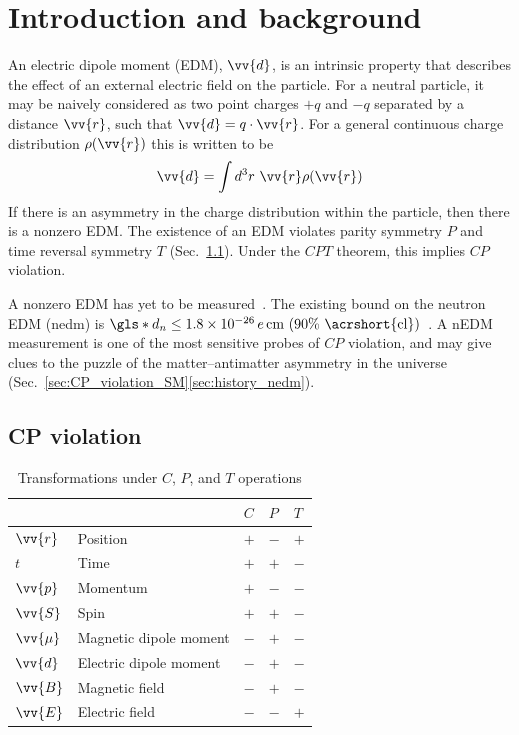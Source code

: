 
\chapter{Introduction and background}


An electric dipole moment (EDM), $\vv{d}$, is an intrinsic property that describes the effect of an external electric field on the particle. For a neutral particle, it may be naively considered as two point charges $+q$ and $-q$ separated by a distance $\vv{r}$, such that $\vv{d}=q\cdot \vv{r}$. For a general continuous charge distribution $\rho(\vv{r})$ this is written to be
%
\begin{gather}
    \vv{d}=\int d^3r\,\,\vv{r}\rho(\vv{r})
\end{gather}
%
If there is an asymmetry in the charge distribution within the particle, then there is a nonzero EDM. The existence of an EDM violates parity symmetry $P$ and time reversal symmetry $T$ (Sec.~\ref{sec:CP_violation}). Under the $CPT$ theorem, this implies $CP$ violation.

A nonzero EDM has yet to be measured~\cite{CHU19}. The existing bound on the neutron EDM (\acrshort*{nedm}) is $\gls*{d_n}\leq \num{1.8e-26}\,e\,\text{cm (90\% \acrshort{cl})}$~\cite{pdg2022}. A nEDM measurement is one of the most sensitive probes of $CP$ violation, and may give clues to the puzzle of the matter–antimatter asymmetry in the universe (Sec.~\ref{sec:CP_violation_SM}\textendash\ref{sec:history_nedm}).


\section{CP violation}\label{sec:CP_violation}


\begin{table}
\centering
\caption[Transformations of relevant physical observables under $C$, $P$, and $T$ operations]{\label{tb:cpt_transform}Transformations under $C$, $P$, and $T$ operations}
\begin{tabular}{lllll}
\toprule
& & $C$ & $P$ & $T$ \\ 
\midrule
$\vv{r}$ & Position & $+$ & $-$ & $+$ \\
$t$ & Time & $+$ & $+$ & $-$ \\
$\vv{p}$ & Momentum & $+$ & $-$ & $-$ \\
$\vv{S}$ & Spin & $+$ & $+$ & $-$ \\
$\vv{\mu}$ & Magnetic dipole moment  & $-$ & $+$ & $-$ \\
$\vv{d}$ & Electric dipole moment  & $-$ & $+$ & $-$ \\
$\vv{B}$ & Magnetic field  & $-$ & $+$ & $-$ \\
$\vv{E}$ & Electric field & $-$ & $-$ & $+$ \\
\bottomrule
\end{tabular}
\end{table}


